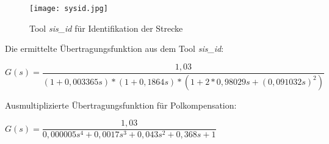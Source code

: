 \newpage

\begin{figure}[h]
	\begin{center}
		\texttt{[image: sysid.jpg]}
		\caption{Tool \textit{sis\_id} für Identifikation der Strecke}
       \label{pic_sis_id}
	\end{center} 
\end{figure}

Die ermittelte Übertragungsfunktion aus dem Tool \textit{sis\_id}: 

\begin{center}
$ G(s) = \dfrac{1,03}{(1 + 0,003365s) * (1 + 0,1864s) * (1 + 2*0,98029s + (0,091032s)^{2}) }$
\end{center}

Ausmultiplizierte Übertragungsfunktion für Polkompensation:

\begin{center}
$ G(s) =  \dfrac{1,03}{0,000005s^{4} + 0,0017s^{3	} + 0,043s^{2} + 0,368s + 1 } $
\end{center}
